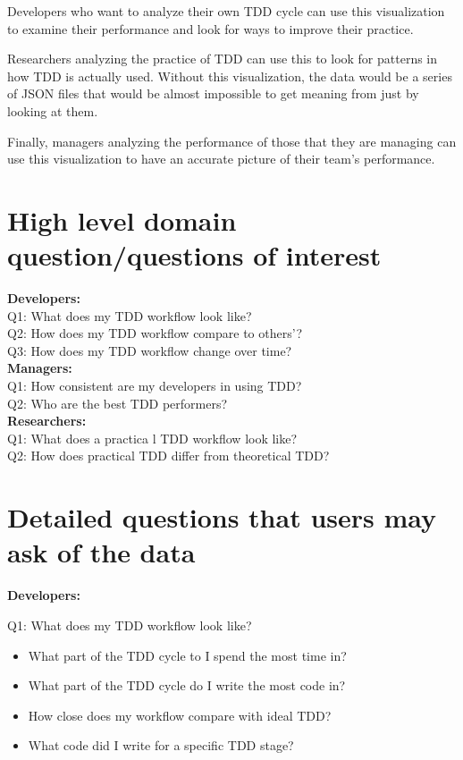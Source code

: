 \documentclass[journal]{vgtc}                %
\begin{document}
Developers who want to analyze their own TDD cycle can use this visualization to examine their performance and look for ways to improve their practice.

Researchers analyzing the practice of TDD can use this to look for patterns in how TDD is actually used.  Without this visualization, the data would be a series of JSON files that would be almost impossible to get meaning from just by looking at them.  

Finally, managers analyzing the performance of those that they are managing can use this visualization to have an accurate picture of their team's performance.

\section{High level domain question/questions of interest}
\label{sec:highq}

\textbf{Developers:} \\
Q1: What does my TDD workflow look like? \\
Q2: How does my TDD workflow compare to others'? \\
Q3: How does my TDD workflow change over time? \\

\textbf{Managers:} \\
Q1: How consistent are my developers in using TDD? \\
Q2: Who are the best TDD performers? \\

\textbf{Researchers:} \\
Q1: What does a practica l TDD workflow look like? \\
Q2: How does practical TDD differ from theoretical TDD? \\

\section{Detailed questions that users may ask of the data}

\textbf{Developers:}

Q1: What does my TDD workflow look like? 
\begin{itemize}
	\item What part of the TDD cycle to I spend the most time in?
	\item What part of the TDD cycle do I write the most code in?
	\item How close does my workflow compare with ideal TDD?
	\item What code did I write for a specific TDD stage?
\end{itemize}
\end{document}
